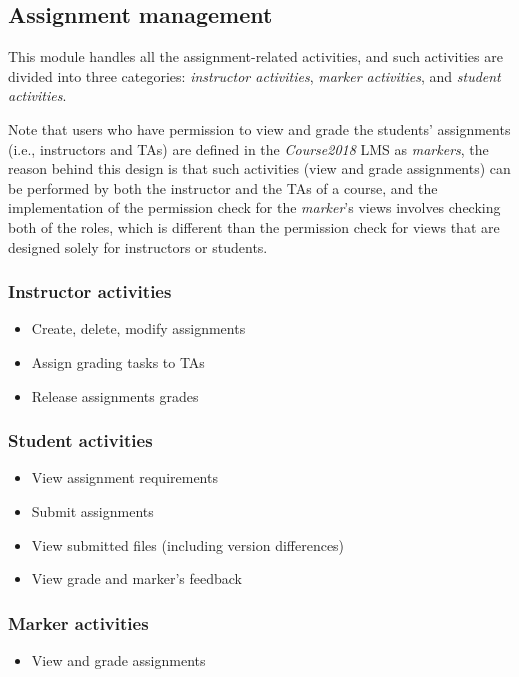 \subsection{Assignment management}
\label{sec:ASNMAN}
This module handles all the assignment-related activities, and such activities are
divided into three categories: \emph{instructor activities}, 
\emph{marker activities}, and \emph{student activities}.

\medskip 

Note that users who have permission to view and grade the students' assignments
(i.e., instructors and TAs)
are defined in the \emph{Course2018} LMS as \emph{markers}, the reason behind
this design is that such activities (view and grade assignments) can be
performed by both the instructor and the TAs of a course, and the implementation
of the permission check for the \emph{marker}'s views involves checking both
of the roles, which is different than the permission check for views that are
designed solely for instructors or students.

\medskip

\subsubsection{Instructor activities}
\begin{itemize}
    \item Create, delete, modify assignments
    \item Assign grading tasks to TAs
    \item Release assignments grades
\end{itemize}

\subsubsection{Student activities}
\begin{itemize}
    \item View assignment requirements
    \item Submit assignments
    \item View submitted files (including version differences)
    \item View grade and marker's feedback
\end{itemize}

\subsubsection{Marker activities}
\begin{itemize}
    \item View and grade assignments
\end{itemize}

